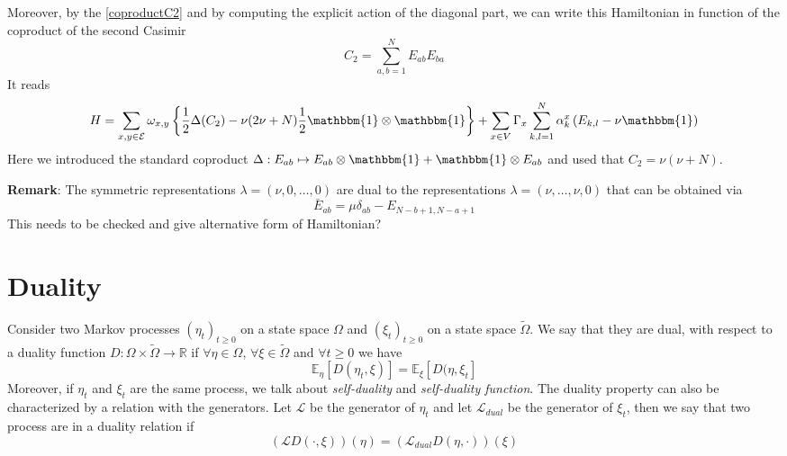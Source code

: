 \documentclass[11pt]{article}
\numberwithin{equation}{subsection}
\newcommand{\twoj}{\nu}
\begin{document}
Moreover, by the \eqref{coproductC2} and by computing the explicit action of the diagonal part, we can write this Hamiltonian in function of the coproduct of the second Casimir
\begin{equation}
    C_{2}=\sum_{a,b=1}^{N}E_{ab}E_{ba}
\end{equation}
It reads
\begin{equation}
	H=\sum_{x,y\in \mathcal{E}}\omega_{x,y}\left\{\frac{1}{2}\Delta(C_{2})-\twoj(2\twoj+N)\frac{1}{2}\mathbbm{1}\otimes\mathbbm{1}\right\}+\sum_{x\in V}\Gamma_{x}\sum_{k,l=1}^{N}\alpha_{k}^{x}\left(E_{k,l}-\twoj\mathbbm{1}\right)
\end{equation}
Here we introduced the standard coproduct $\Delta:E_{ab}\mapsto E_{ab}\otimes \mathbbm{1}+\mathbbm{1}\otimes E_{ab}$ and used that $C_{2}=\twoj(\twoj+N)$. 

 
\textbf{Remark}: The symmetric representations $\lambda=(\twoj,0,\ldots,0)$ are dual to the representations $\lambda=(\twoj,\ldots,\twoj,0)$ that can be obtained via 
\begin{equation}
   \bar E_{ab}=\mu\delta_{ab}-E_{N-b+1,N-a+1}
\end{equation}
{\color{red} This needs to be checked and give alternative form of Hamiltonian?}


\section{Duality}
Consider two Markov processes $(\eta_{t})_{t\geq 0}$ on a state space $\Omega$ and $(\xi_{t})_{t\geq 0}$ on a state space $\widetilde{\Omega}$. We say that they are dual, with respect to a duality function $D:\Omega\times \widetilde{\Omega}\to \mathbb{R}$ if $\forall \eta\in \Omega$, $\forall \xi\in \widetilde{\Omega}$ and $\forall t\geq 0$ we have 
\begin{equation}
    \mathbb{E}_{\eta}\left[D(\eta_{t},\xi)\right]=\mathbb{E}_{\xi}\left[D(\eta,\xi_{t}\right]
\end{equation}
Moreover, if $\eta_{t}$ and $\xi_{t}$ are the same process, we talk about \textit{self-duality} and \textit{self-duality function}. The duality property can also be characterized by a relation with the generators. Let $\mathcal{L}$ be the generator of $\eta_{t}$ and let $\mathcal{L}_{dual}$ be the generator of $\xi_{t}$, then we say that two process are in a duality relation if 
\begin{equation}
    \left(\mathcal{L}D(\cdot,\xi)\right)(\eta)=\left(\mathcal{L}_{dual}D(\eta,\cdot)\right)(\xi)
\end{equation}
\end{document}
